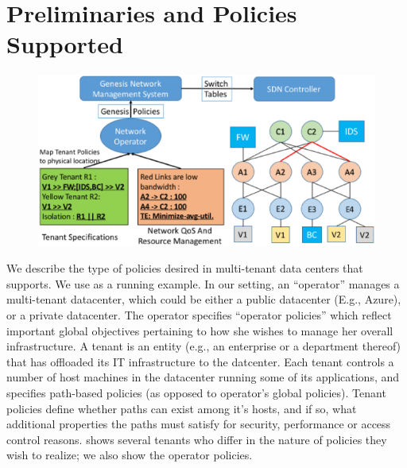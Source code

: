 \section{Preliminaries and Policies Supported}
\begin{figure}
	\includegraphics[width=\columnwidth,center]{figures/architecture.eps}
	\label{fig:architecture}
\end{figure}



We describe the type of policies desired in multi-tenant data centers
that \Name supports. We use  as a running
example. In our setting, an ``operator'' manages a multi-tenant
datacenter, which could be either a public datacenter (E.g., Azure),
or a private datacenter. The operator specifies ``operator policies''
which reflect important global objectives pertaining to how she wishes
to manage her overall infrastructure.
 A tenant is an entity (e.g., an enterprise or a department thereof)
 that has offloaded its IT infrastructure to the datcenter. Each
 tenant controls a number of host machines in the datacenter running
 some of its applications, and specifies path-based policies (as
 opposed to operator's global policies). Tenant policies define
 whether paths can exist among it's hosts, and if so, what additional
 properties the paths must satisfy for security, performance or access
 control reasons.  shows several tenants who
 differ in the nature of policies they wish to realize; we also show
 the operator policies.

